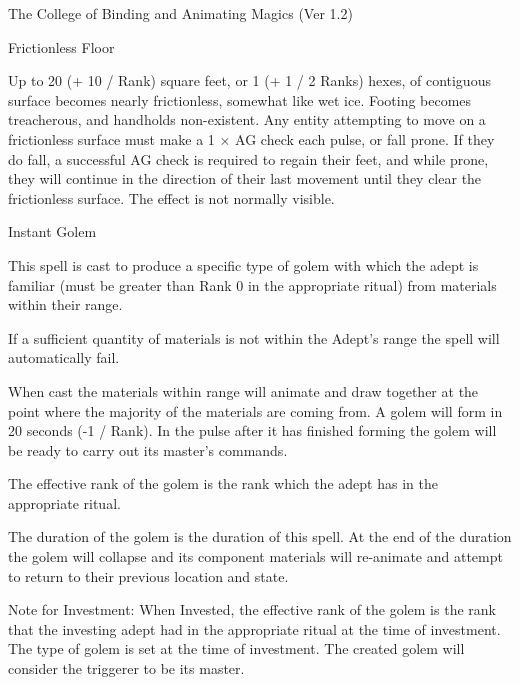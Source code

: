 \begin{Chapter}{The College of Binding and Animating Magics (Ver 1.2)}
\begin{spell}[S-3]{Frictionless Floor }
\begin{effects}
Up to 20 (+ 10 / Rank) square feet, or 1 (+ 1 / 2 Ranks) hexes, of
contiguous surface becomes nearly frictionless, somewhat like wet
ice. Footing becomes treacherous, and handholds non-existent.  Any
entity attempting to move on a frictionless surface must make a 1 × AG
check each pulse, or fall prone. If they do fall, a successful AG
check is required to regain their feet, and while prone, they will
continue in the direction of their last movement until they clear the
frictionless surface.  The effect is not normally visible.
\end{effects}
\end{spell}

\begin{spell}[S-4]{Instant Golem}
\begin{effects}
This spell is cast to produce a specific type of golem with which the
adept is familiar (must be greater than Rank 0 in the appropriate
ritual) from materials within their range.

If a sufficient quantity of materials is not within the Adept’s range
the spell will automatically fail.

When cast the materials within range will animate and draw together at
the point where the majority of the materials are coming from.  A
golem will form in 20 seconds (-1 / Rank). In the pulse after it has
finished forming the golem will be ready to carry out its master’s
commands.

The effective rank of the golem is the rank which the adept has in the
appropriate ritual.

The duration of the golem is the duration of this spell.  At the end
of the duration the golem will collapse and its component materials
will re-animate and attempt to return to their previous location and
state.

Note for Investment: When Invested, the effective rank of the golem is
the rank that the investing adept had in the appropriate ritual at the
time of investment. The type of golem is set at the time of
investment.  The created golem will consider the triggerer to be its
master.


\end{effects}
\end{spell}
\end{Chapter}
